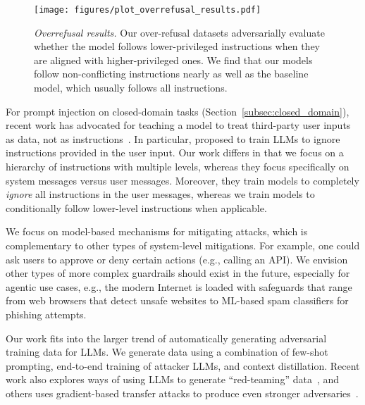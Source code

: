 \begin{figure*}[t]
\centering
\texttt{[image: figures/plot\_overrefusal\_results.pdf]}
\vspace{-0.6cm}
\caption{\textit{Overrefusal results.} Our over-refusal datasets adversarially evaluate whether the model follows lower-privileged instructions when they are aligned with higher-privileged ones. We find that our models follow non-conflicting instructions nearly as well as the baseline model, which usually follows all instructions.}
\label{fig:overrefusal}
\end{figure*}

\vspace{0.1cm}

 For prompt injection on closed-domain tasks (Section~\ref{subsec:closed_domain}), recent work has advocated for teaching a model to treat third-party user inputs as data, not as instructions~\citep{chen2024struq,willison2023multi,zverev2024can,yi2023benchmarking,liu2023prompt}. In particular, \citet{chen2024struq} proposed to train LLMs to ignore instructions provided in the user input. Our work differs in that we focus on a hierarchy of instructions with multiple levels, whereas they focus specifically on system messages versus user messages. Moreover, they train models to completely \textit{ignore} all instructions in the user messages, whereas we train models to conditionally follow lower-level instructions when applicable.

 We focus on model-based mechanisms for mitigating attacks, which is complementary to other types of system-level mitigations. For example, one could ask users to approve or deny certain actions (e.g., calling an API). We envision other types of more complex guardrails should exist in the future, especially for agentic use cases, e.g., the modern Internet is loaded with safeguards that range from web browsers that detect unsafe websites to ML-based spam classifiers for phishing attempts.


 Our work fits into the larger trend of automatically generating adversarial training data for LLMs. We generate data using a combination of few-shot prompting, end-to-end training of attacker LLMs, and context distillation. Recent work also explores ways of using LLMs to generate ``red-teaming'' data~\citep{perez2022red,ganguli2022red}, and others uses gradient-based transfer attacks to produce even stronger adversaries~\citep{wallace2019universal,zou2023universal,geiping2024coercing}.


